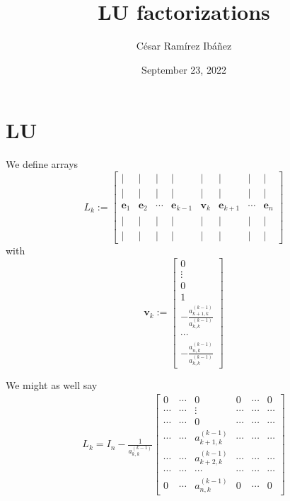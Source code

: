 \documentclass[12pt]{article}
\title{LU factorizations}
\author{C\'{e}sar Ram\'{i}rez Ib\'{a}\~{n}ez  }
\date{September 23, 2022 }
\theoremstyle{definition}
\begin{document}
\section{LU}

We define arrays 
\begin{equation}
L_{k}:= \begin{bmatrix}
| & | & | & | & | & | & | & | \\
| & | & | & | & | & | & | & | \\ 
\mathbf{e}_1 & \mathbf{e}_2 & \cdots & \mathbf{e}_{k-1} & \mathbf{v}_{k} & \mathbf{e}_{k+1} & \cdots & \mathbf{e}_n \\ 
| & | & | & | & | & | & | & | \\ 
| & | & | & | & | & | & | & |
\end{bmatrix} 
\end{equation}
with 
\begin{equation}
\mathbf{v}_{k}:=\begin{bmatrix}
0 \\ 
\vdots \\ 
0 \\ 
1 \\ 
 -\frac{a_{k+1,k}^{(k-1)}}{a_{k,k}^{(k-1)}}\\ 
\cdots \\ 
-\frac{a_{n,k}^{(k-1)}}{a_{k,k}^{(k-1)}}
\end{bmatrix} 
\end{equation}

We might as well say
\begin{align*}
L_k=I_{n}-\frac{1}{a_{k,k}^{(k-1)}}\begin{bmatrix}
0 & \cdots & 0 & 0 & \cdots & 0 \\ 
\cdots & \cdots & \vdots & \cdots & \cdots & \cdots \\ 
\cdots & \cdots & 0 & \cdots & \cdots & \cdots \\ 
\cdots & \cdots & a^{(k-1)}_{k+1,k} & \cdots & \cdots & \cdots \\ 
\cdots & \cdots & a^{(k-1)}_{k+2,k} & \cdots & \cdots & \cdots \\ 
\cdots & \cdots & \cdots & \cdots & \cdots & \cdots \\ 
0 & \cdots & a^{(k-1)}_{n,k} & 0 & \cdots & 0
\end{bmatrix} 
\end{align*}
\end{document}
